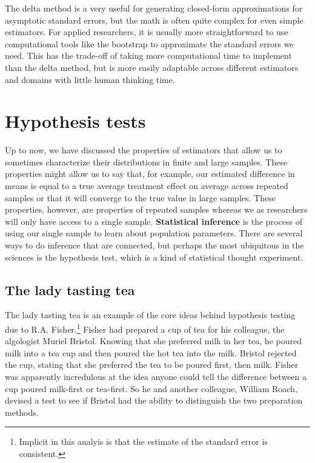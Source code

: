 \documentclass[
  letterpaper,
  DIV=11,
  numbers=noendperiod]{scrreprt}
\theoremstyle{definition}
\theoremstyle{plain}
\theoremstyle{definition}
\theoremstyle{remark}
\begin{document}
The delta method is a very useful for generating closed-form
approximations for asymptotic standard errors, but the math is often
quite complex for even simple estimators. For applied researchers, it is
usually more straightforward to use computational tools like the
bootstrap to approximate the standard errors we need. This has the
trade-off of taking more computational time to implement than the delta
method, but is more easily adaptable across different estimators and
domains with little human thinking time.


\hypertarget{hypothesis-tests}{%
\chapter{Hypothesis tests}\label{hypothesis-tests}}

Up to now, we have discussed the properties of estimators that allow us
to sometimes characterize their distributions in finite and large
samples. These properties might allow us to say that, for example, our
estimated difference in means is equal to a true average treatment
effect on average across repeated samples or that it will converge to
the true value in large samples. These properties, however, are
properties of repeated samples whereas we as researchers will only have
access to a single sample. \textbf{Statistical inference} is the process
of using our single sample to learn about population parameters. There
are several ways to do inference that are connected, but perhaps the
most ubiquitous in the sciences is the hypothesis test, which is a kind
of statistical thought experiment.

\hypertarget{the-lady-tasting-tea}{%
\section{The lady tasting tea}\label{the-lady-tasting-tea}}

The lady tasting tea is an example of the core ideas behind hypothesis
testing due to R.A. Fisher.\footnote{Implicit in this analyis is that
  the estimate of the standard error is consistent.} Fisher had prepared
a cup of tea for his colleague, the algologist Muriel Bristol. Knowing
that she preferred milk in her tea, he poured milk into a tea cup and
then poured the hot tea into the milk. Bristol rejected the cup, stating
that she preferred the tea to be poured first, then milk. Fisher was
apparently incredulous at the idea anyone could tell the difference
between a cup poured milk-first or tea-first. So he and another
colleague, William Roach, devised a test to see if Bristol had the
ability to distinguish the two preparation methods.
\end{document}
